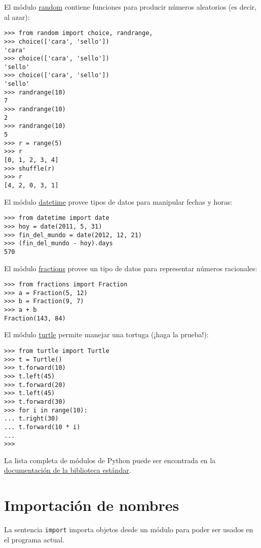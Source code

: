 El módulo \href{http://docs.python.org/library/random.html}{random}
contiene funciones para producir números aleatorios (es decir, al azar):

\begin{lstlisting}
>>> from random import choice, randrange,
>>> choice(['cara', 'sello'])
'cara'
>>> choice(['cara', 'sello'])
'sello'
>>> choice(['cara', 'sello'])
'sello'
>>> randrange(10)
7
>>> randrange(10)
2
>>> randrange(10)
5
>>> r = range(5)
>>> r
[0, 1, 2, 3, 4]
>>> shuffle(r)
>>> r
[4, 2, 0, 3, 1]
\end{lstlisting}

El módulo \href{http://docs.python.org/library/datetime.html}{datetime}
provee tipos de datos para manipular fechas y horas:

\begin{lstlisting}
>>> from datetime import date
>>> hoy = date(2011, 5, 31)
>>> fin_del_mundo = date(2012, 12, 21)
>>> (fin_del_mundo - hoy).days
570
\end{lstlisting}

El módulo
\href{http://docs.python.org/library/fractions.html}{fractions} provee
un tipo de datos para representar números racionales:

\begin{lstlisting}
>>> from fractions import Fraction
>>> a = Fraction(5, 12)
>>> b = Fraction(9, 7)
>>> a + b
Fraction(143, 84)
\end{lstlisting}

El módulo \href{http://docs.python.org/library/turtle.html}{turtle}
permite manejar una tortuga (¡haga la prueba!):

\begin{lstlisting}
>>> from turtle import Turtle
>>> t = Turtle()
>>> t.forward(10)
>>> t.left(45)
>>> t.forward(20)
>>> t.left(45)
>>> t.forward(30)
>>> for i in range(10):
... t.right(30)
... t.forward(10 * i)
...
>>>
\end{lstlisting}

La lista completa de módulos de Python puede ser encontrada en la
\href{http://docs.python.org/library/index.html}{documentación de la
biblioteca estándar}.

\section{Importación de nombres}

La sentencia \lstinline!import! importa objetos desde un módulo para
poder ser usados en el programa actual.

